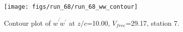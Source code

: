 \begin{figure}[H]
\centering
\texttt{[image: figs/run\_68/run\_68\_ww\_contour]}
\caption{Contour plot of $\overline{w^\prime w^\prime}$ at $z/c$=10.00, $V_{free}$=29.17, station 7.}
\end{figure}



